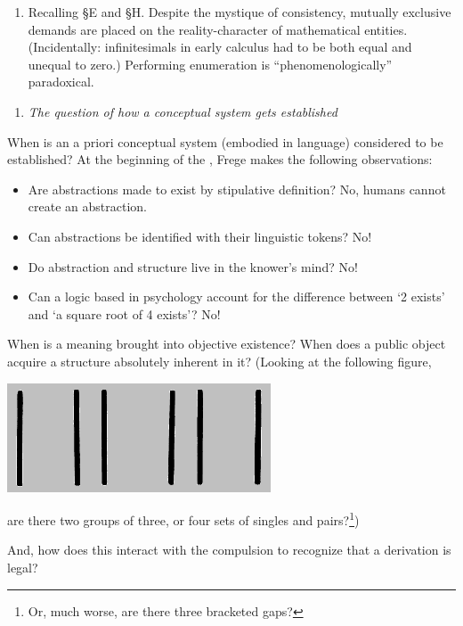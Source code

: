 \jarule

\begin{enumerate}[resume*]
\item Recalling {\S}E and {\S}H. Despite the mystique of consistency, mutually exclusive demands are placed on the reality-character of mathematical entities. (Incidentally: infinitesimals in early calculus had to be both equal and unequal to zero.) Performing enumeration is \enquote{phenomenologically} paradoxical.
\end{enumerate}

\jarule

\begin{enumerate}[resume*]
\item \textit{The question of how a conceptual system gets established}
\end{enumerate}

When is an a priori conceptual system (embodied in language) considered to be established? At the beginning of the , Frege makes the following observations:

\begin{itemize}
\item Are abstractions made to exist by stipulative definition? No, humans cannot create an abstraction.
\item Can abstractions be identified with their linguistic tokens? No!
\item Do abstraction and structure live in the knower's mind? No!
\item Can a logic based in psychology account for the difference between `2 exists' and `a square root of 4 exists'? No!
\end{itemize}

When is a meaning brought into objective existence? When does a public object acquire a structure absolutely inherent in it? (Looking at the following figure,
\parbox{4in}{{\centering\includegraphics{img/strokes}\par}}
are there two groups of three, or four sets of singles and pairs?\footnote{Or, much worse, are there three bracketed gaps?})

And, how does this interact with the compulsion to recognize that a derivation is legal?

